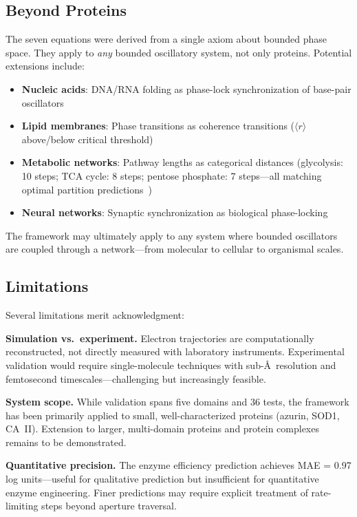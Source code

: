 \documentclass[aps,prx,superscriptaddress,twocolumn,10pt,a4paper,longbibliography,preprint]{revtex4-2}
\newcommand{\orderp}{\langle r \rangle}
\theoremstyle{definition}
\theoremstyle{remark}
\begin{document}
\subsection{Beyond Proteins}

The seven equations were derived from a single axiom about bounded phase space. They apply to \emph{any} bounded oscillatory system, not only proteins. Potential extensions include:

\begin{itemize}
\item \textbf{Nucleic acids}: DNA/RNA folding as phase-lock synchronization of base-pair oscillators
\item \textbf{Lipid membranes}: Phase transitions as coherence transitions ($\orderp$ above/below critical threshold)
\item \textbf{Metabolic networks}: Pathway lengths as categorical distances (glycolysis: 10 steps; TCA cycle: 8 steps; pentose phosphate: 7 steps---all matching optimal partition predictions~\cite{Sachikonye2026c})
\item \textbf{Neural networks}: Synaptic synchronization as biological phase-locking
\end{itemize}

The framework may ultimately apply to any system where bounded oscillators are coupled through a network---from molecular to cellular to organismal scales.

\subsection{Limitations}

Several limitations merit acknowledgment:

\textbf{Simulation vs.\ experiment.} Electron trajectories are computationally reconstructed, not directly measured with laboratory instruments. Experimental validation would require single-molecule techniques with sub-\AA\ resolution and femtosecond timescales---challenging but increasingly feasible.

\textbf{System scope.} While validation spans five domains and 36 tests, the framework has been primarily applied to small, well-characterized proteins (azurin, SOD1, CA~II). Extension to larger, multi-domain proteins and protein complexes remains to be demonstrated.

\textbf{Quantitative precision.} The enzyme efficiency prediction achieves MAE = 0.97 log units---useful for qualitative prediction but insufficient for quantitative enzyme engineering. Finer predictions may require explicit treatment of rate-limiting steps beyond aperture traversal.
\end{document}
